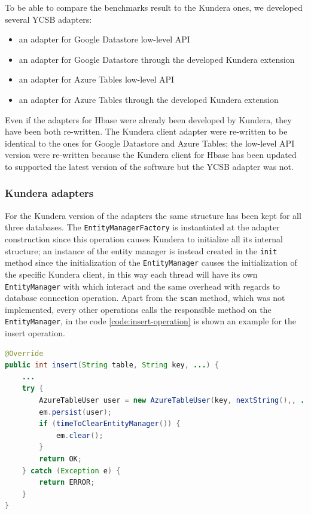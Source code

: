 \newparagraph To be able to compare the benchmarks result to the Kundera ones, we developed  several YCSB adapters:
\begin{itemize}
\item an adapter for Google Datastore low-level API
\item an adapter for Google Datastore through the developed Kundera extension
\item an adapter for Azure Tables low-level API
\item an adapter for Azure Tables through the developed Kundera extension
\end{itemize}
\noindent Even if the adapters for Hbase were already been developed by Kundera, they have been both re-written. The Kundera client adapter were re-written to be identical to the ones for Google Datastore and Azure Tables; the low-level API version were re-written because the Kundera client for Hbase has been updated to supported the latest version of the software but the YCSB adapter was not.

\subsubsection{Kundera adapters}
For the Kundera version of the adapters the same structure has been kept for all three databases. The \texttt{EntityManagerFactory} is instantiated at the adapter construction since this operation causes Kundera to initialize all its internal structure; an instance of the entity manager is instead created in the \texttt{init} method since the initialization of the \texttt{EntityManager} causes the initialization of the specific Kundera client, in this way each thread will have its own \texttt{EntityManager} with which interact and the same overhead with regards to database connection operation.
Apart from the \texttt{scan} method, which was not implemented, every other operations calls the responsible method on the \texttt{EntityManager}, in the code \ref{code:insert-operation} is shown an example for the insert operation.

\begin{lstlisting}[language=Java, caption=Insert operation of the Azure Tables adapter, label=code:insert-operation]
@Override
public int insert(String table, String key, ...) {
    ...
    try {
        AzureTableUser user = new AzureTableUser(key, nextString(),, ...);
        em.persist(user);
        if (timeToClearEntityManager()) {
            em.clear();
        }
        return OK;
    } catch (Exception e) {
        return ERROR;
    }
}
\end{lstlisting}

